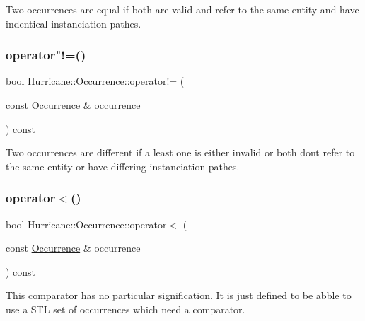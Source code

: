Two occurrences are equal if both are valid and refer to the same entity and have indentical instanciation pathes. \mbox{\label{classHurricane_1_1Occurrence_a39edad19edeef964e5340381360c0add}} 
\subsubsection{\texorpdfstring{operator"!=()}{operator!=()}}
{\footnotesize\ttfamily bool Hurricane\+::\+Occurrence\+::operator!= (\begin{DoxyParamCaption}\item[{const \mbox{\hyperlink{classHurricane_1_1Occurrence}{Occurrence}} \&}]{occurrence }\end{DoxyParamCaption}) const}

Two occurrences are different if a least one is either invalid or both don\textquotesingle{}t refer to the same entity or have differing instanciation pathes. \mbox{\label{classHurricane_1_1Occurrence_a2f1668ccce22799c99eb3a02e522c204}} 
\subsubsection{\texorpdfstring{operator$<$()}{operator<()}}
{\footnotesize\ttfamily bool Hurricane\+::\+Occurrence\+::operator$<$ (\begin{DoxyParamCaption}\item[{const \mbox{\hyperlink{classHurricane_1_1Occurrence}{Occurrence}} \&}]{occurrence }\end{DoxyParamCaption}) const}

This comparator has no particular signification. It is just defined to be abble to use a S\+TL set of occurrences which need a comparator. \mbox{\label{classHurricane_1_1Occurrence_ac121005d5d3bc0837f66c0de4265b0c4}} 
